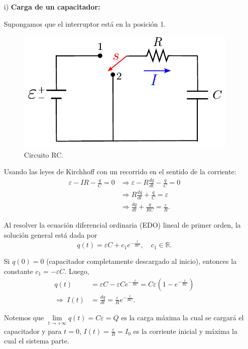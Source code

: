 \begin{itemize}
\item[i)] \textbf{Carga de un capacitador:}

Supongamos que el interruptor está en la posición 1.

\begin{figure}[H]
    \centering
    \includegraphics[scale = 0.75]{Figuras/Circuito-RC-Carga.pdf}
    \caption{Circuito RC.}
    \label{fig:Circuito-RC}
\end{figure}

Usando las leyes de Kirchhoff con un recorrido en el sentido de la corriente:
\begin{align}
  \varepsilon - IR - \frac{q}{C} = 0 
&\Rightarrow \varepsilon - R \frac{dq}{dt} - \frac{q}{C}  = 0 \nonumber \\
&\Rightarrow  R \frac{dq}{dt} + \frac{q}{C}  = \varepsilon \nonumber \\
&\Rightarrow  \frac{dq}{dt} +  \frac{q}{RC} =\frac{\varepsilon}{R}.   \label{eq:Circuit-RC}
\end{align}

Al resolver la ecuación diferencial ordinaria (EDO) lineal de primer orden, la solución general está dada por
$$q(t) = \varepsilon C + c_1 e^{-\frac{t}{RC}}, \quad c_1 \in \mathbb{R}.$$

Si $q(0) = 0$ (capacitador completamente descargado al inicio), entonces la constante $c_1 = - \varepsilon C$. Luego,
\begin{align*}
  q(t) &= \varepsilon C - \varepsilon C e^{-\frac{t}{RC}} = C \varepsilon (1 - e^{-\frac{t}{RC}}) \\
\Rightarrow ~ I(t) &= \frac{dq}{dt} = \frac{\varepsilon}{R}e^{-\frac{t}{RC}}.  
\end{align*}

Notemos que $\lim\limits_{t \to + \infty} q(t) =  C \varepsilon = Q$ es la carga máxima la cual se cargará el capacitador y para $t = 0$, $I(t) = \frac{\varepsilon}{R} = I_0$ es la corriente inicial y máxima la cual el sistema parte.


\end{itemize}
